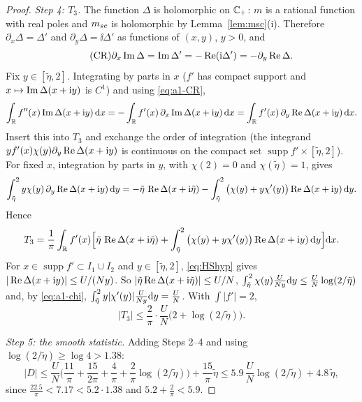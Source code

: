 \begin{proof}
\emph{Step 4: $T_3$.} The function $\Delta$ is holomorphic on $\mathbb{C}_+$: $m$ is a rational function with real poles and $m_{sc}$ is holomorphic by Lemma~\ref{lem:msc}(i). Therefore $\partial_x\Delta=\Delta'$ and $\partial_y\Delta=\ii\Delta'$ as functions of $(x,y)$, $y>0$, and
\begin{equation}\tag{CR}\label{eq:a1-CR}
 \partial_x\operatorname{Im}\Delta=\operatorname{Im}\Delta'=-\operatorname{Re}(\mathrm{i}\Delta')=-\partial_y\operatorname{Re}\Delta .
\end{equation}
Fix $y\in[\tilde\eta,2]$. Integrating by parts in $x$ ($f'$ has compact support and $x\mapsto\operatorname{Im}\Delta(x+\mathrm{i} y)$ is $C^1$) and using \eqref{eq:a1-CR},
\[
 \int_{\mathbb{R}} f''(x)\operatorname{Im}\Delta(x+\mathrm{i} y)\,\mathrm{d} x=-\int_{\mathbb{R}} f'(x)\,\partial_x\operatorname{Im}\Delta(x+\mathrm{i} y)\,\mathrm{d} x=\int_{\mathbb{R}} f'(x)\,\partial_y\operatorname{Re}\Delta(x+\mathrm{i} y)\,\mathrm{d} x .
\]
Insert this into $T_3$ and exchange the order of integration (the integrand $yf'(x)\chi(y)\partial_y\operatorname{Re}\Delta(x+\mathrm{i} y)$ is continuous on the compact set $\operatorname{supp}f'\times[\tilde\eta,2]$). For fixed $x$, integration by parts in $y$, with $\chi(2)=0$ and $\chi(\tilde\eta)=1$, gives
\[
 \int_{\tilde\eta}^2y\chi(y)\,\partial_y\operatorname{Re}\Delta(x+\mathrm{i} y)\,\mathrm{d} y=-\tilde\eta\,\operatorname{Re}\Delta(x+\mathrm{i}\tilde\eta)-\int_{\tilde\eta}^2\big(\chi(y)+y\chi'(y)\big)\operatorname{Re}\Delta(x+\mathrm{i} y)\,\mathrm{d} y .
\]
Hence
\[
 T_3=\frac1\pi\int_{\mathbb{R}} f'(x)\Big[\tilde\eta\,\operatorname{Re}\Delta(x+\mathrm{i}\tilde\eta)+\int_{\tilde\eta}^2\big(\chi(y)+y\chi'(y)\big)\operatorname{Re}\Delta(x+\mathrm{i} y)\,\mathrm{d} y\Big]\mathrm{d} x .
\]
For $x\in\operatorname{supp}f'\subset I_1\cup I_2$ and $y\in[\tilde\eta,2]$, \eqref{eq:HShyp} gives $|\operatorname{Re}\Delta(x+\mathrm{i} y)|\le U/(Ny)$. So $|\tilde\eta\operatorname{Re}\Delta(x+\mathrm{i}\tilde\eta)|\le U/N$, $\int_{\tilde\eta}^2\chi(y)\frac{U}{Ny}\mathrm{d} y\le\frac UN\log(2/\tilde\eta)$ and, by \eqref{eq:a1-chi},
$\int_{\tilde\eta}^2y|\chi'(y)|\frac U{Ny}\mathrm{d} y=\frac UN$. With $\int|f'|=2$,
\[
 |T_3|\le\frac2\pi\cdot\frac UN\big(2+\log(2/\tilde\eta)\big).
\]

\emph{Step 5: the smooth statistic.} Adding Steps 2--4 and using $\log(2/\tilde\eta)\ge\log4>1.38$:
\[
 |D|\le\frac UN\Big(\frac{11}\pi+\frac{15}{2\pi}+\frac4\pi+\frac2\pi\log(2/\tilde\eta)\Big)+\frac{15}\pi\tilde\eta\le5.9\,\frac UN\log(2/\tilde\eta)+4.8\,\tilde\eta ,
\]
since $\frac{22.5}{\pi}<7.17<5.2\cdot1.38$ and $5.2+\frac2\pi<5.9$.


\end{proof}
